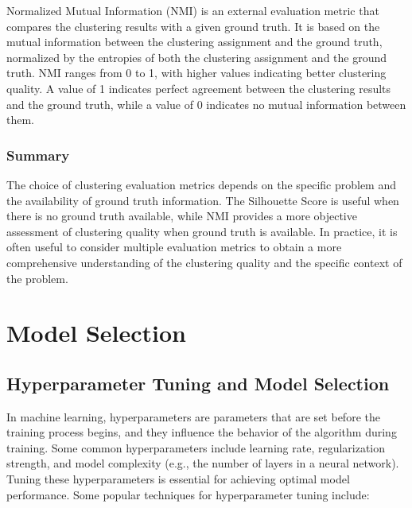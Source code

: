 \documentclass[12pt]{article}
\begin{document}
Normalized Mutual Information (NMI) is an external evaluation metric that compares the clustering results with a given ground truth. It is based on the mutual information between the clustering assignment and the ground truth, normalized by the entropies of both the clustering assignment and the ground truth. NMI ranges from 0 to 1, with higher values indicating better clustering quality. A value of 1 indicates perfect agreement between the clustering results and the ground truth, while a value of 0 indicates no mutual information between them.

\subsubsection{Summary}

The choice of clustering evaluation metrics depends on the specific problem and the availability of ground truth information. The Silhouette Score is useful when there is no ground truth available, while NMI provides a more objective assessment of clustering quality when ground truth is available. In practice, it is often useful to consider multiple evaluation metrics to obtain a more comprehensive understanding of the clustering quality and the specific context of the problem.



\section{Model Selection}

\subsection{Hyperparameter Tuning and Model Selection}
In machine learning, hyperparameters are parameters that are set before the training process begins, and they influence the behavior of the algorithm during training. Some common hyperparameters include learning rate, regularization strength, and model complexity (e.g., the number of layers in a neural network). Tuning these hyperparameters is essential for achieving optimal model performance. Some popular techniques for hyperparameter tuning include:
\end{document}
